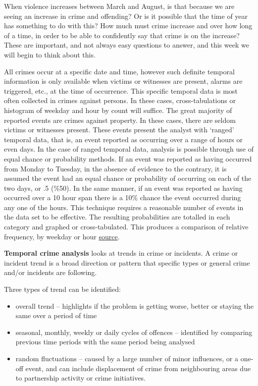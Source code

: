 \documentclass[]{book}
\providecommand{\tightlist}{%
  \setlength{\itemsep}{0pt}\setlength{\parskip}{0pt}}
\begin{document}
When violence increases between March and August, is that because we are seeing an increase in crime and offending? Or is it possible that the time of year has something to do with this? How much must crime increase and over how long of a time, in order to be able to confidently say that crime is on the increase? These are important, and not always easy questions to answer, and this week we will begin to think about this.

All crimes occur at a specific date and time, however such definite temporal information is only available when victims or witnesses are present, alarms are triggered, etc., at the time of occurrence. This specific temporal data is most often collected in crimes against persons. In these cases, cross-tabulations or histogram of weekday and hour by count will suffice. The great majority of reported events are crimes against property. In these cases, there are seldom victims or witnesses present. These events present the analyst with `ranged' temporal data, that is, an event reported as occurring over a range of hours or even days. In the case of ranged temporal data, analysis is possible through use of equal chance or probability methods. If an event was reported as having occurred from Monday to Tuesday, in the absence of evidence to the contrary, it is assumed the event had an equal chance or probability of occurring on each of the two days, or .5 (\%50). In the same manner, if an event was reported as having occurred over a 10 hour span there is a 10\% chance the event occurred during any one of the hours. This technique requires a reasonable number of events in the data set to be effective. The resulting probabilities are totalled in each category and graphed or cross-tabulated. This produces a comparison of relative frequency, by weekday or hour \href{http://cradpdf.drdc-rddc.gc.ca/PDFS/unc76/p530054.pdf}{source}.

\textbf{Temporal crime analysis} looks at trends in crime or incidents. A crime or incident trend is a broad direction or pattern that specific types or general crime and/or incidents are following.

Three types of trend can be identified:

\begin{itemize}
\tightlist
\item
  overall trend -- highlights if the problem is getting worse, better or staying the same over a period of time
\item
  seasonal, monthly, weekly or daily cycles of offences -- identified by comparing previous time periods with the same period being analysed
\item
  random fluctuations -- caused by a large number of minor influences, or a one-off event, and can include displacement of crime from neighbouring areas due to partnership activity or crime initiatives.
\end{itemize}
\end{document}
